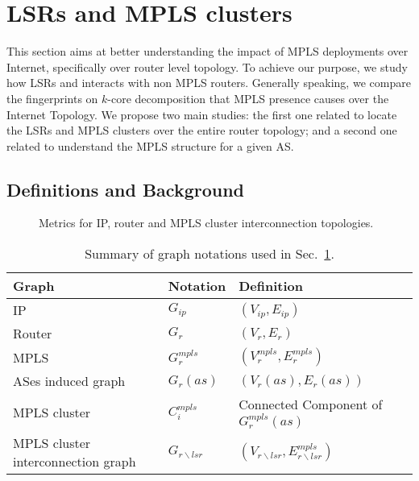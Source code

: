 \section{LSRs and MPLS clusters}\label{cluster}
This section aims at better
understanding the impact of MPLS deployments over Internet, specifically over
router level topology. To achieve our purpose, we study how LSRs and  
interacts  with non MPLS routers. Generally speaking, we compare the fingerprints  on $k$-core 
decomposition that MPLS presence causes over the Internet Topology. We propose two main studies: the
first one related to locate the LSRs and MPLS clusters over the entire router topology; and a second
one related to understand the MPLS structure for a given AS.

\subsection{Definitions and Background}\label{cluster.methodo}
\begin{figure*}[!htb]
  \begin{center}
    \hfil
    \hfil
  \end{center}
\caption{Metrics for IP, router and MPLS cluster interconnection
topologies.} 
\label{fig_metrics}
\end{figure*}

\begin{table}[!t]
  \begin{center}
    \begin{tabular}{l|ll}
    \textbf{Graph} & \textbf{Notation} & \textbf{Definition}\\
    \hline
    IP                 & $G_{ip}$ & $(V_{ip}, E_{ip})$\\
    Router             & $G_r$ & $(V_r, E_r)$\\    
    MPLS               & $G_r^{mpls}$ & $(V_r^{mpls}, E_r^{mpls})$\\
    ASes induced graph & $G_r(as)$ & $(V_r(as), E_r(as))$\\    
    MPLS cluster       & $C_i^{mpls}$ & Connected Component of $G_r^{mpls}(as)$\\
    MPLS cluster interconnection graph & $G_{r \backslash lsr}$ & $(V_{r
    \backslash lsr}, E_{r \backslash lsr}^{mpls})$
    \end{tabular}
  \end{center}
  \caption{Summary of graph notations used in Sec.~\ref{cluster}.}
  \label{cluster.table_notations}
\end{table}


